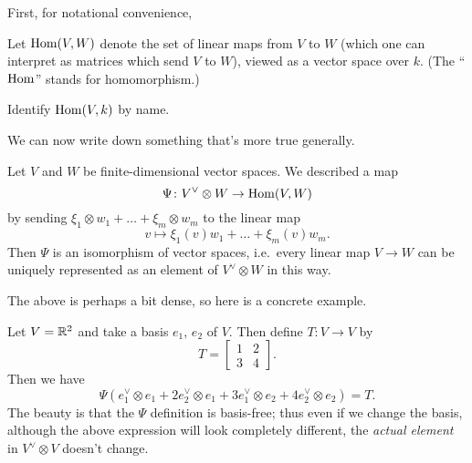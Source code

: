 First, for notational convenience,
\begin{definition}
	Let $\operatorname{Hom}(V,W)$ denote the set of linear maps from $V$ to $W$
	(which one can interpret as matrices which send $V$ to $W$),
	viewed as a vector space over $k$.
	(The ``$\operatorname{Hom}$'' stands for homomorphism.)
\end{definition}
\begin{ques}
	Identify $\operatorname{Hom}(V,k)$ by name.
\end{ques}

We can now write down something that's more true generally.
\begin{theorem}
	\label{thm:vect_hom_dualization}
	Let $V$ and $W$ be finite-dimensional vector spaces.
	We described a map
	\[ \Psi \colon V^\vee \otimes W \to \operatorname{Hom}(V,W) \]
	by sending $\xi_1 \otimes w_1 + \dots + \xi_m \otimes w_m$ to the linear map
	\[ v \mapsto \xi_1(v) w_1 + \dots + \xi_m(v) w_m. \]
	Then $\Psi$ is an isomorphism of vector spaces, i.e.\ every linear map $V \to W$
	can be uniquely represented as an element of $V^\vee \otimes W$ in this way.
\end{theorem}

The above is perhaps a bit dense, so here is a concrete example.
\begin{example}
	Let $V = \mathbb R^2$ and take a basis $e_1$, $e_2$ of $V$.
	Then define $T : V \to V$ by
	\[ T = \begin{bmatrix}
			1 & 2 \\ 3 & 4
		\end{bmatrix}. \]
	Then we have
	\[ \Psi(e_1^\vee \otimes e_1 + 2e_2^\vee \otimes e_1
		+ 3e_1^\vee \otimes e_2 + 4e_2^\vee \otimes e_2) = T. \]
	The beauty is that the $\Psi$ definition is basis-free;
	thus even if we change the basis,
	although the above expression will look completely different,
	the \emph{actual element} in $V^\vee \otimes V$ doesn't change.
\end{example}

